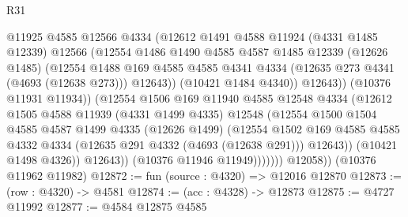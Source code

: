 \begin{lexlean}{R31}
\begin{coremodule}
                            @11925
                            @4585
                            @12566
                            @4334
                            (@12612
                              @1491
                              @4588
                              @11924
                              (@4331 @1485 @12339)
                              @12566
                              (@12554
                                @1486
                                @1490
                                @4585
                                @4587
                                @1485
                                @12339
                                (@12626 @1485)
                                (@12554
                                  @1488
                                  @169
                                  @4585
                                  @4585
                                  @4341
                                  @4334
                                  (@12635 @273 @4341 (@4693 (@12638 @273)))
                                  @12643))
                              (@10421 @1484 @4340))
                            @12643))
                        (@10376 @11931 @11934))
                      (@12554
                        @1506
                        @169
                        @11940
                        @4585
                        @12548
                        @4334
                        (@12612
                          @1505
                          @4588
                          @11939
                          (@4331 @1499 @4335)
                          @12548
                          (@12554
                            @1500
                            @1504
                            @4585
                            @4587
                            @1499
                            @4335
                            (@12626 @1499)
                            (@12554
                              @1502
                              @169
                              @4585
                              @4585
                              @4332
                              @4334
                              (@12635 @291 @4332 (@4693 (@12638 @291)))
                              @12643))
                          (@10421 @1498 @4326))
                        @12643))
                    (@10376 @11946 @11949)))))))
        @12058))
    (@10376 @11962 @11982)
@12872 := fun (source : @4320) => @12016 @12870
@12873 := (row : @4320) -> @4581
@12874 := (acc : @4328) -> @12873
@12875 := @4727 @11992
@12877 := @4584 @12875 @4585

\end{coremodule}
\end{lexlean}
